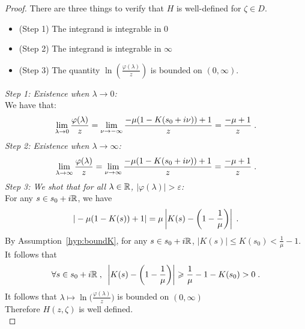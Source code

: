 \begin{proof}
There are three things to verify that $H$ is well-defined for $\zeta \in D$. 
\begin{itemize}
    \item (Step 1) The integrand is integrable in $0$
    \item (Step 2) The integrand is integrable in $\infty$
    \item  (Step 3) The quantity $\ln\left(\frac{\varphi(\lambda)}{z} \right)$ is bounded on $(0, \infty)$.
\end{itemize}
\textit{Step 1: Existence when $\lambda \to 0$:}\\
We have that: 
\begin{align*}
    \lim_{\lambda \to 0}\frac{\varphi(\lambda)}{z} = \lim_{\nu\to-\infty}\frac{-\mu(1-K(s_0+i\nu))+1}{z} = \frac{-\mu+1}{z}
    \; .
\end{align*}
\textit{Step 2: Existence when $\lambda \to \infty$:}
\begin{align*}
    \lim_{\lambda \to \infty}\frac{\varphi(\lambda)}{z} = \lim_{\nu\to\infty}\frac{-\mu(1-K(s_0+i\nu))+1}{z} = \frac{-\mu+1}{z}
    \; .
\end{align*}
\textit{Step 3: We shot that for all $\lambda \in \mathbb{R}$, $|\varphi(\lambda)| > \varepsilon$: }\\
For any $s \in s_0 + i\mathbb{R}$, we have
    \begin{align*}
        |-\mu(1-K(s))+1| 
        = \mu \left|K(s) - \left(1-\frac{1}{\mu}\right)\right|
        \; .
    \end{align*}
By Assumption~\ref{hyp:boundK}, for any $s \in s_0 + i\mathbb{R}$, $|K(s)| \leq K(s_0) < \frac{1}{\mu} - 1$. It follows that
\begin{align*}
    \forall s \in s_0 + i\mathbb{R}
    \; , \enspace
    \left|K(s) - \left(1-\frac{1}{\mu}\right)\right| \geqslant \frac{1}\mu - 1 - K(s_0) > 0
    \; .
\end{align*}
It follows that $\lambda \mapsto \ln\Big(\frac{\varphi(\lambda)}{z}\Big)$ is bounded on $(0, \infty)$\\

Therefore
$H(z,\zeta)$ is well defined.\\


\end{proof}
